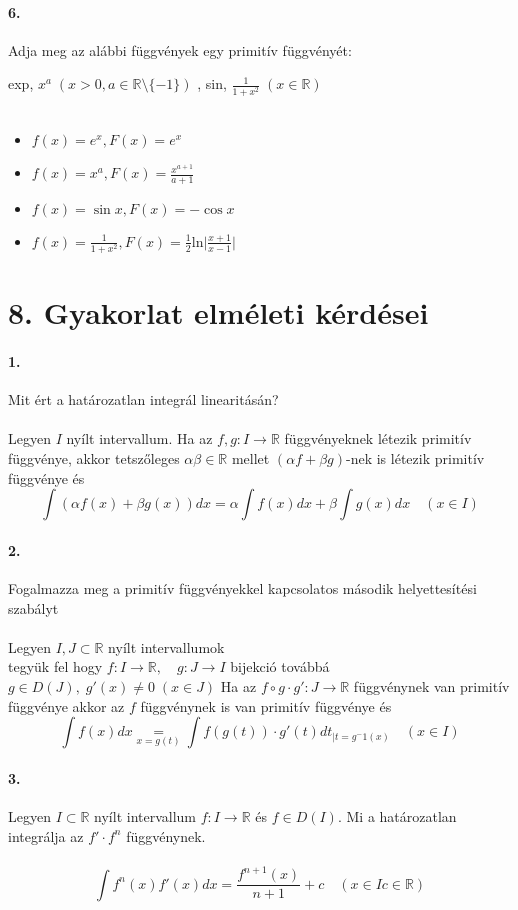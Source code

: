 \documentclass[10pt,a4paper]{article}
\newcommand{\R}{\mathbb{R}}
\renewcommand{\>}{\rightarrow}
\begin{document}
\paragraph{6.}
Adja meg az alábbi függvények egy primitív függvényét: 

exp, $x^a \; (x>0, a \in \R \setminus \{-1\})$ , sin, $\frac{1}{1+x^2} \; (x\in\R)$ \\\\
\begin{itemize}
\item $f(x) = e^x, F(x) = e^x$
\item $f(x) = x^a, F(x) = \frac{x^{a+1}}{a+1}$
\item $f(x) = \sin{x}, F(x) = -\cos{x} $ 
\item $f(x) = \frac{1}{1+x^2}, F(x) = \frac{1}{2} \text{ln} \big\lvert \frac{x+1}{x-1}\big\rvert$
\end{itemize} 
\newpage
\section{8. Gyakorlat elméleti kérdései}
\paragraph{1.} Mit ért a határozatlan integrál linearitásán? \\\\
Legyen $I$ nyílt intervallum. Ha az $f,g : I \rightarrow \R$ függvényeknek létezik primitív függvénye, akkor tetszőleges $\alpha \beta \in \R$ mellet $(\alpha f + \beta g)$-nek is létezik primitív függvénye és 
\[
\int (\alpha f(x) + \beta g(x))dx = \alpha \int f(x) dx + \beta \int g(x) dx \quad (x\in I)
\]
\paragraph{2.} Fogalmazza meg a primitív függvényekkel kapcsolatos második helyettesítési szabályt \\\\
Legyen $I,J \subset \R $ nyílt intervallumok \\
tegyük fel hogy  $f:I \rightarrow \R, \quad g: J \rightarrow I$ bijekció továbbá $g\in D(J), \; g'(x) \neq 0 \; (x\in J)$ Ha az $f \circ g \cdot g' : J \rightarrow \R $ függvénynek van primitív függvénye akkor az $f$ függvénynek is van primitív függvénye és 
\[
\int f(x)dx \underset{x=g(t)}{=} \int f(g(t)) \cdot g'(t) dt_{\big\lvert t=g^-1(x)} \quad (x\in I)
\]
\paragraph{3.}
Legyen 	$I\subset \R$ nyílt intervallum $f:I\> \R$ és $f\in D(I)$. Mi a határozatlan integrálja az $f'\cdot f^n$ függvénynek. \\\\
\[
\int f^n(x)f'(x) dx = \frac{f^{n+1}(x)}{n+1} +c \quad (x\in I c\in \R)
\]
\end{document}
